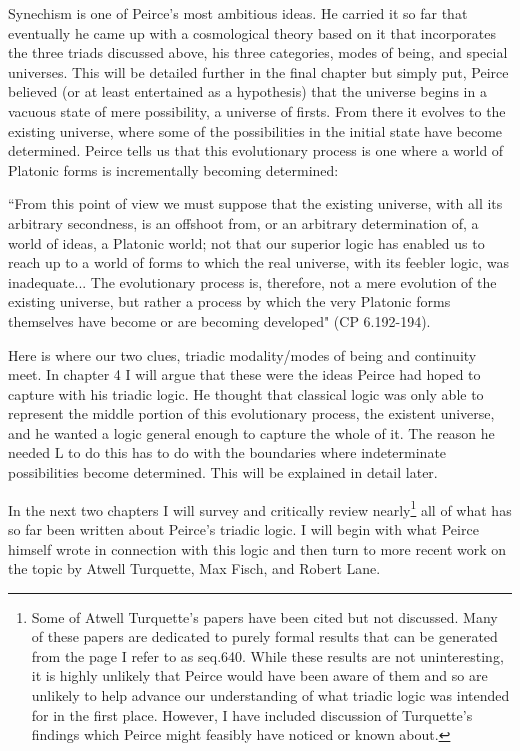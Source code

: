 \documentclass[12pt]{article}
\begin{document}
Synechism is one of Peirce's most ambitious ideas. He carried it so far that eventually he came up with a cosmological theory based on it that incorporates the three triads discussed above, his three categories, modes of being, and special universes. This will be detailed further in the final chapter but simply put, Peirce believed (or at least entertained as a hypothesis) that the universe begins in a vacuous state of mere possibility, a universe of firsts. From there it evolves to the existing universe, where some of the possibilities in the initial state have become determined. Peirce tells us that this evolutionary process is one where a world of Platonic forms is incrementally becoming determined:
\begin{singlespace}
``From this point of view we must suppose that the existing universe, with all its arbitrary secondness, is an offshoot from, or an arbitrary determination of, a world of ideas, a Platonic world; not that our superior logic has enabled us to reach up to a world of forms to which the real universe, with its feebler logic, was inadequate... The evolutionary process is, therefore, not a mere evolution of the existing universe, but rather a process by which the very Platonic forms themselves have become or are becoming developed" (CP 6.192-194).
\end{singlespace}
\noindent Here is where our two clues, triadic modality/modes of being and continuity meet. In chapter 4 I will argue that these were the ideas Peirce had hoped to capture with his triadic logic. He thought that classical logic was only able to represent the middle portion of this evolutionary process, the existent universe, and he wanted a logic general enough to capture the whole of it. The reason he needed L to do this has to do with the boundaries where indeterminate possibilities become determined. This will be explained in detail later.

In the next two chapters I will survey and critically review nearly\footnote{Some of Atwell Turquette's papers have been cited but not discussed. Many of these papers are dedicated to purely formal results that can be generated from the page I refer to as seq.640. While these results are not uninteresting, it is highly unlikely that Peirce would have been aware of them and so are unlikely to help advance our understanding of what triadic logic was intended for in the first place. However, I have included discussion of Turquette's findings which Peirce might feasibly have noticed or known about.} all of  what has so far been written about Peirce's triadic logic. I will begin with what Peirce himself wrote in connection with this logic and then turn to more recent work on the topic by Atwell Turquette, Max Fisch, and Robert Lane.
\end{document}
